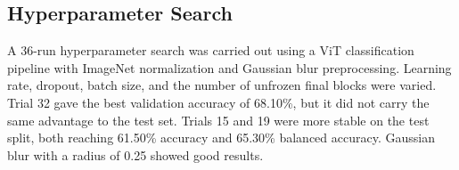 \documentclass[twocolumn,10pt]{article}
\begin{document}
\begin{table}[H]
\centering
\scriptsize
{}
\caption{Equalized dataset multiclass confusion matrix}
\label{tab:equalized_cm}
\end{table}

\begin{table}[H]
\centering
\scriptsize
{}
\caption{ResNet18 direct four-class confusion matrix}
\label{tab:resnet_direct_cm}
\end{table}

\subsection{Hyperparameter Search}
A 36-run hyperparameter search was carried out using a ViT classification pipeline with ImageNet normalization and Gaussian blur preprocessing. Learning rate, dropout, batch size, and the number of unfrozen final blocks were varied. Trial 32 gave the best validation accuracy of 68.10\%, but it did not carry the same advantage to the test set. Trials 15 and 19 were more stable on the test split, both reaching 61.50\% accuracy and 65.30\% balanced accuracy. Gaussian blur with a radius of 0.25 showed good results.
\end{document}
